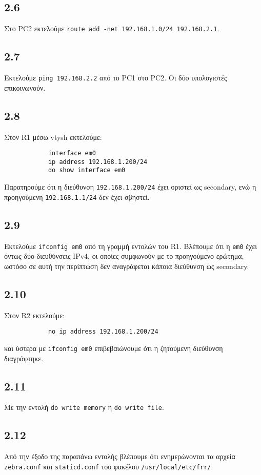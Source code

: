 \documentclass[a4paper, 12pt]{article}
\begin{document}
	\subsection*{2.6}
		Στο PC2 εκτελούμε \verb|route add -net 192.168.1.0/24 192.168.2.1|.

	\subsection*{2.7}
		Εκτελούμε \verb|ping 192.168.2.2| από το PC1 στο PC2. Οι δύο υπολογιστές επικοινωνούν.

	\subsection*{2.8}
		Στον R1 μέσω vtysh εκτελούμε:
		
		\begin{verbatim}
			interface em0
			ip address 192.168.1.200/24
			do show interface em0
		\end{verbatim}
		
		Παρατηρούμε ότι η διεύθυνση \verb|192.168.1.200/24| έχει οριστεί ως secondary, ενώ η προηγούμενη \verb|192.168.1.1/24| δεν έχει σβηστεί.

	\subsection*{2.9}
		Εκτελούμε \verb|ifconfig em0| από τη γραμμή εντολών του R1. Βλέπουμε ότι η \verb|em0| έχει όντως δύο διευθύνσεις IPv4, οι οποίες συμφωνούν με το προηγούμενο ερώτημα, ωστόσο σε αυτή την περίπτωση δεν αναγράφεται κάποια διεύθυνση ως secondary.

	\subsection*{2.10}  
		Στον R2 εκτελούμε:
		
		\begin{verbatim}
			no ip address 192.168.1.200/24
		\end{verbatim}
		
		και ύστερα με \verb|ifconfig em0| επιβεβαιώνουμε ότι η ζητούμενη διεύθυνση διαγράφτηκε.

	\subsection*{2.11}
		Με την εντολή \verb|do write memory| ή \verb|do write file|.

	\subsection*{2.12}
		Από την έξοδο της παραπάνω εντολής βλέπουμε ότι ενημερώνονται τα αρχεία \verb|zebra.conf| και \verb|staticd.conf| του φακέλου \verb|/usr/local/etc/frr/|.
\end{document}
